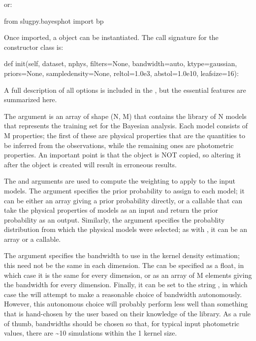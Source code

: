 \documentclass[letterpaper,10pt,english]{sphinxmanual}
\begin{document}
or:

\begin{sphinxVerbatim}[commandchars=\\\{\}]
from slugpy.bayesphot import bp
\end{sphinxVerbatim}

Once imported, a  object can be instantiated. The call signature for the  constructor class is:

\begin{sphinxVerbatim}[commandchars=\\\{\}]
def \PYGZus{}\PYGZus{}init\PYGZus{}\PYGZus{}(self, dataset, nphys, filters=None, bandwidth=\PYGZsq{}auto\PYGZsq{},
             ktype=\PYGZsq{}gaussian\PYGZsq{}, priors=None, sample\PYGZus{}density=None,
             reltol=1.0e\PYGZhy{}3, abstol=1.0e\PYGZhy{}10, leafsize=16):
\end{sphinxVerbatim}

A full description of all options is included in the {\hyperref[\detokenize{bayesphot:ssec-slugpy-bayesphot}]{}}, but the essential features are summarized here.

The argument  is an array of shape (N, M) that contains the library of N models that represents the training set for the Bayesian analysis. Each model consists of M properties; the first  of these are physical properties that are the quantities to be inferred from the observations, while the remaining ones are photometric properties. An important point is that the  object is NOT copied, so altering it after the  object is created will result in erroneous results.

The  and  arguments are used to compute the weighting to apply to the input models. The  argument specifies the prior probability to assign to each model; it can be either an array giving a prior probability directly, or a callable that can take the physical properties of models as an input and return the prior probability as an output. Similarly, the  argument specifies the probablity distribution from which the physical models were selected; as with , it can be an array or a callable.

The  argument specifies the bandwidth to use in the kernel density estimation; this need not be the same in each dimension. The  can be specified as a float, in which case it is the same for every dimension, or as an array of M elements giving the bandwidth for every dimension. Finally, it can be set to the string , in which case the  will attempt to make a reasonable choice of bandwidth autonomously. However, this autonomous choice will probably perform less well than something that is hand-chosen by the user based on their knowledge of the library. As a rule of thumb, bandwidths should be chosen so that, for typical input photometric values, there are \textasciitilde{}10 simulations within the 1 kernel size.
\end{document}
